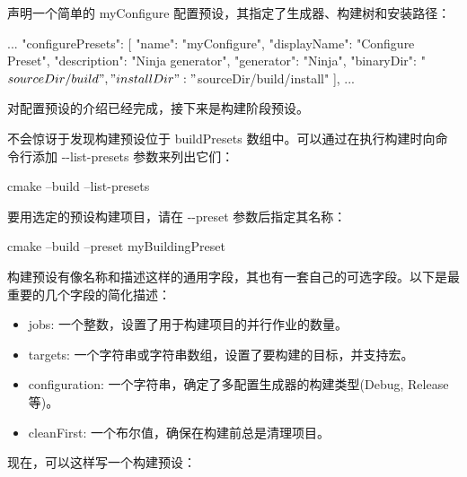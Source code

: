 
声明一个简单的 myConfigure 配置预设，其指定了生成器、构建树和安装路径：


\begin{json}
...
    "configurePresets": [
        {
            "name": "myConfigure",
            "displayName": "Configure Preset",
            "description": "Ninja generator",
            "generator": "Ninja",
            "binaryDir": "${sourceDir}/build",
            "installDir": "${sourceDir}/build/install"
        }
    ],
...
\end{json}

对配置预设的介绍已经完成，接下来是构建阶段预设。


不会惊讶于发现构建预设位于 buildPresets 数组中。可以通过在执行构建时向命令行添加 -{}-list-presets 参数来列出它们：

\begin{shell}
cmake --build --list-presets
\end{shell}

要用选定的预设构建项目，请在 -{}-preset 参数后指定其名称：

\begin{shell}
cmake --build --preset myBuildingPreset
\end{shell}

构建预设有像名称和描述这样的通用字段，其也有一套自己的可选字段。以下是最重要的几个字段的简化描述：

\begin{itemize}
\item
jobs: 一个整数，设置了用于构建项目的并行作业的数量。

\item
targets: 一个字符串或字符串数组，设置了要构建的目标，并支持宏。

\item
configuration: 一个字符串，确定了多配置生成器的构建类型(Debug, Release等)。

\item
cleanFirst: 一个布尔值，确保在构建前总是清理项目。
\end{itemize}

现在，可以这样写一个构建预设：


